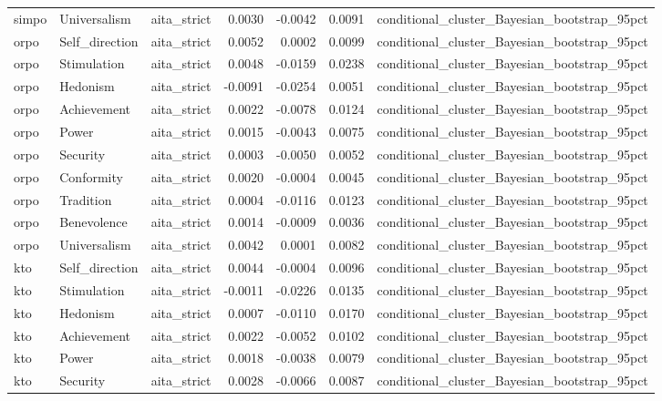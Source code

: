 \begin{tabular}{lllrrrl}
simpo & Universalism & aita\_strict & 0.0030 & -0.0042 & 0.0091 & conditional\_cluster\_Bayesian\_bootstrap\_95pct \\
orpo & Self\_direction & aita\_strict & 0.0052 & 0.0002 & 0.0099 & conditional\_cluster\_Bayesian\_bootstrap\_95pct \\
orpo & Stimulation & aita\_strict & 0.0048 & -0.0159 & 0.0238 & conditional\_cluster\_Bayesian\_bootstrap\_95pct \\
orpo & Hedonism & aita\_strict & -0.0091 & -0.0254 & 0.0051 & conditional\_cluster\_Bayesian\_bootstrap\_95pct \\
orpo & Achievement & aita\_strict & 0.0022 & -0.0078 & 0.0124 & conditional\_cluster\_Bayesian\_bootstrap\_95pct \\
orpo & Power & aita\_strict & 0.0015 & -0.0043 & 0.0075 & conditional\_cluster\_Bayesian\_bootstrap\_95pct \\
orpo & Security & aita\_strict & 0.0003 & -0.0050 & 0.0052 & conditional\_cluster\_Bayesian\_bootstrap\_95pct \\
orpo & Conformity & aita\_strict & 0.0020 & -0.0004 & 0.0045 & conditional\_cluster\_Bayesian\_bootstrap\_95pct \\
orpo & Tradition & aita\_strict & 0.0004 & -0.0116 & 0.0123 & conditional\_cluster\_Bayesian\_bootstrap\_95pct \\
orpo & Benevolence & aita\_strict & 0.0014 & -0.0009 & 0.0036 & conditional\_cluster\_Bayesian\_bootstrap\_95pct \\
orpo & Universalism & aita\_strict & 0.0042 & 0.0001 & 0.0082 & conditional\_cluster\_Bayesian\_bootstrap\_95pct \\
kto & Self\_direction & aita\_strict & 0.0044 & -0.0004 & 0.0096 & conditional\_cluster\_Bayesian\_bootstrap\_95pct \\
kto & Stimulation & aita\_strict & -0.0011 & -0.0226 & 0.0135 & conditional\_cluster\_Bayesian\_bootstrap\_95pct \\
kto & Hedonism & aita\_strict & 0.0007 & -0.0110 & 0.0170 & conditional\_cluster\_Bayesian\_bootstrap\_95pct \\
kto & Achievement & aita\_strict & 0.0022 & -0.0052 & 0.0102 & conditional\_cluster\_Bayesian\_bootstrap\_95pct \\
kto & Power & aita\_strict & 0.0018 & -0.0038 & 0.0079 & conditional\_cluster\_Bayesian\_bootstrap\_95pct \\
kto & Security & aita\_strict & 0.0028 & -0.0066 & 0.0087 & conditional\_cluster\_Bayesian\_bootstrap\_95pct \\

\end{tabular}

